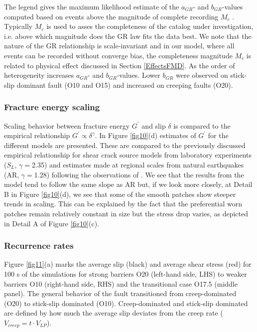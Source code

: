 \documentclass[preprint,1p, 10pt,authoryear]{elsarticle}
\begin{document}
The legend gives the maximum likelihood estimate of the $a_{GR}$- and $b_{GR}$-values computed based on events above the magnitude of complete recording $M_{c}$ \citep{Wiemer2002}. Typically $M_{c}$ is used to asses the completeness of the catalog under investigation, i.e. above which magnitude does the GR law fits the data best. We note that the nature of the GR relationship is scale-invariant and in our model, where all events can be recorded without converge bias, the completeness magnitude $M_{c}$ is related to physical effect discussed in Section \ref{EffectsFMD}. As the order of heterogeneity increases $a_{GR}$- and $b_{GR}$-values. Lower $b_{GR}$ were observed on stick-slip dominant fault (O10 and O15) and increased on creeping faults (O20).

\subsubsection{Fracture energy scaling}
\label{FracEnergy}
Scaling behavior between fracture energy $G^{'}$ and slip $\delta$  is compared to the  empirical relationship $G^{'} \propto \delta^{\gamma}$. In Figure \ref{fig10}(d) estimates of $G^{'}$ for the different models are presented. These are compared to the previously discussed empirical relationship for shear crack source models from laboratory experiments ($S_{L}$, $\gamma = $2.35) \citep{Selvadurai2019}  and estimates made at regional scales from natural earthquakes (AR, $\gamma = $1.28) following the observations of \citet{Abercrombie2005} \citep[see also][]{Mai2006}.  We see that the results from the model tend to follow the same slope as AR but, if we look more closely, at Detail B in Figure \ref{fig10}(d), we see that some of the smooth patches show steeper trends in scaling. This can be explained by the fact that the preferential worn patches remain relatively constant in size but the stress drop varies, as depicted in Detail A of Figure \ref{fig10}(c).

\subsubsection{Recurrence rates}
\label{Recurrence times}
Figure \ref{fig11}(a) marks the average slip (black) and average shear stress (red) for 100 s of the simulations for strong barriers O20 (left-hand side, LHS) to weaker barriers O10 (right-hand side, RHS) and the transitional case O17.5 (middle panel). The general behavior of the fault transitioned from creep-dominated (O20) to stick-slip dominated (O10). Creep-dominated and stick-slip dominated are defined by how much the average slip deviates from the creep rate ($V_{creep} = t\cdot V_{LP}$). 
\end{document}
